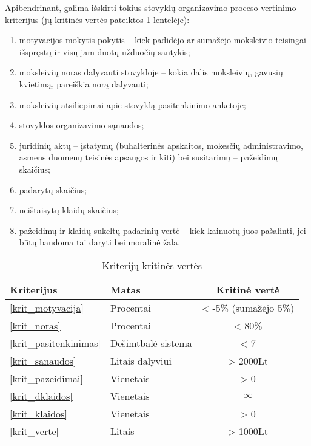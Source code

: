 Apibendrinant, galima išskirti tokius stovyklų organizavimo proceso 
vertinimo kriterijus (jų kritinės vertės pateiktos \ref{tab:krit}
lentelėje):
\begin{enumerate}
  \item \label{krit_motyvacija}
    motyvacijos mokytis pokytis – kiek padidėjo
    ar sumažėjo moksleivio teisingai išspręstų ir visų jam duotų užduočių
    santykis; 
  \item \label{krit_noras}
    moksleivių noras dalyvauti stovykloje – kokia 
    dalis moksleivių, gavusių kvietimą, pareiškia norą dalyvauti;
  \item \label{krit_pasitenkinimas}
    moksleivių atsiliepimai apie stovyklą pasitenkinimo anketoje;
  \item \label{krit_sanaudos}
    stovyklos organizavimo sąnaudos;
  \item \label{krit_pazeidimai}
    juridinių aktų – įstatymų (buhalterinės apskaitos,
    mokesčių administravimo, asmens duomenų teisinės apsaugos
    ir kiti) bei susitarimų – pažeidimų skaičius;
  \item \label{krit_dklaidos}
    padarytų \glsdarbkldgsk {} skaičius;
  \item \label{krit_klaidos}
    neištaisytų klaidų skaičius;
  \item \label{krit_verte}
    pažeidimų  ir klaidų sukeltų padarinių vertė – kiek kainuotų juos 
    pašalinti, jei būtų bandoma tai daryti bei moralinė žala.

\end{enumerate}

\begin{table}[h!]
  \centering
  \begin{tabular}[]{| l | l | c |}
    \hline
    Kriterijus & Matas & Kritinė vertė \\
    \hline
    \ref{krit_motyvacija} & Procentai & < -5\% (sumažėjo 5\%) \\
    \hline
    \ref{krit_noras} & Procentai & < 80\% \\
    \hline
    \ref{krit_pasitenkinimas} & Dešimtbalė sistema & < 7 \\
    \hline
    \ref{krit_sanaudos} & Litais dalyviui & > 2000Lt \\
    \hline
    \ref{krit_pazeidimai} & Vienetais & > 0 \\
    \hline
    \ref{krit_dklaidos} & Vienetais & $\infty$\\
    \hline
    \ref{krit_klaidos} & Vienetais & > 0 \\ 
    \hline
    \ref{krit_verte} & Litais & > 1000Lt \\
    \hline
  \end{tabular}
  \caption{Kriterijų kritinės vertės}
  \label{tab:krit}
\end{table}

